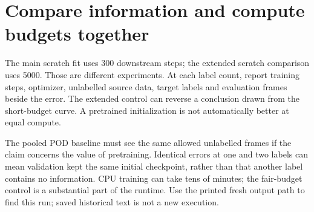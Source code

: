 \section*{Compare information and compute budgets together}
The main scratch fit uses 300 downstream steps; the extended scratch comparison
uses 5000. Those are different experiments. At each label count, report training
steps, optimizer, unlabelled source data, target labels and evaluation frames
beside the error. The extended control can reverse a conclusion drawn from the
short-budget curve. A pretrained initialization is not automatically better at
equal compute.

The pooled POD baseline must see the same allowed unlabelled frames if the claim
concerns the value of pretraining. Identical errors at one and two labels can
mean validation kept the same initial checkpoint, rather than that another label
contains no information. CPU training can take tens of minutes; the fair-budget
control is a substantial part of the runtime. Use the printed fresh output path
to find this run; saved historical text is not a new execution.
